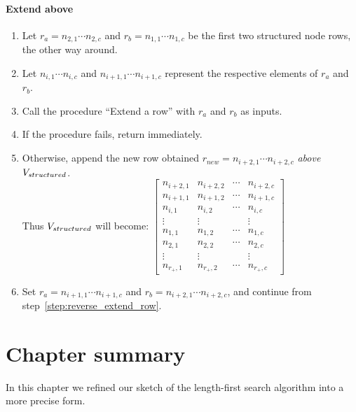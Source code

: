\paragraph{Extend above}
\begin{enumerate}[resume]
\item \label{step:init_reverse_row} Let $r_a = n_{2,1} \cdots n_{2,c}$ and $r_b = n_{1,1} \cdots n_{1,c}$ be the first two structured node rows, the other way around.
\item \label{step:reverse_extend_row} Let $n_{i,1} \cdots n_{i,c}$ and $n_{i+1,1} \cdots n_{i+1,c}$ represent the respective elements of $r_a$ and $r_b$.
\item Call the procedure ``Extend a row'' with $r_a$ and $r_b$ as inputs.
\item If the procedure fails, return immediately.
\item Otherwise, append the new row obtained $r_{new} = n_{i+2,1} \cdots n_{i+2,c}$ \emph{above} $V_{structured}$.\\
Thus $V_{structured}$ will become:
$\begin{bmatrix}
	n_{i+2,1} & n_{i+2,2} & \cdots  & n_{i+2,c} \\
	n_{i+1,1} & n_{i+1,2} & \cdots  & n_{i+1,c} \\
	n_{i,1}   & n_{i,2}   & \cdots  & n_{i,c}   \\
	\vdots    & \vdots    &         & \vdots    \\
	n_{1,1}   & n_{1,2}   & \cdots  & n_{1,c}   \\
	n_{2,1}   & n_{2,2}   & \cdots  & n_{2,c}   \\
	\vdots    & \vdots    &         & \vdots    \\
	n_{r_+,1} & n_{r_+,2} & \cdots  & n_{r_+,c}
	\end{bmatrix}$
\item Set $r_a = n_{i+1,1} \cdots n_{i+1,c}$ and $r_b = n_{i+2,1} \cdots n_{i+2,c}$, and continue from step~\ref{step:reverse_extend_row}.
\end{enumerate}

\section{Chapter summary}
In this chapter we refined our sketch of the length-first search algorithm into a more precise form.
